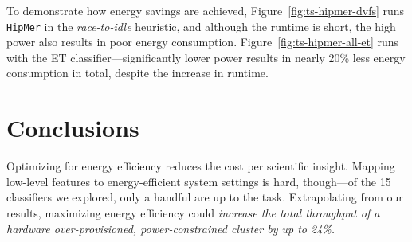 \documentclass[a0,portrait]{a0poster}
\newcommand{\figref}[1]{Figure~\ref{fig:#1}}
\newcommand{\app}[1]{\mbox{\texttt{#1}}}
\begin{document}
\begin{multicols}{2}
To demonstrate how energy savings are achieved, \figref{ts-hipmer-dvfs} runs \app{HipMer} in the \emph{race-to-idle} heuristic, and although the runtime is short, the high power also results in poor energy consumption.
\figref{ts-hipmer-all-et} runs with the ET classifier---significantly lower power results in nearly 20\% less energy consumption in total, despite the increase in runtime.











\color{SaddleBrown} %

\section*{Conclusions}

Optimizing for energy efficiency reduces the cost per scientific insight.
Mapping low-level features to energy-efficient system settings is hard, though---of the 15 classifiers we explored, only a handful are up to the task.
Extrapolating from our results, maximizing energy efficiency could \emph{increase the total throughput of a hardware over-provisioned, power-constrained cluster by up to 24\%.}


\color{DarkSlateGray} %






\end{multicols}
\end{document}
